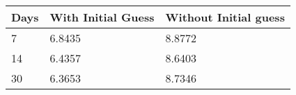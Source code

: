 \begin{tabular}{lll}
Days & With Initial Guess & Without Initial guess \\ 
\hline 
7 & 6.8435 & 8.8772 \\ 
14 & 6.4357 & 8.6403 \\ 
30 & 6.3653 & 8.7346 \\ 
\hline 
\end{tabular}